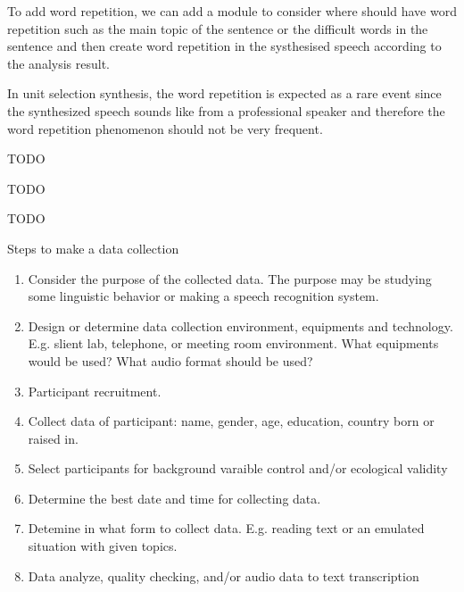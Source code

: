 \documentclass[12pt]{article}
\newenvironment{problem}[2][Problem]{\begin{trivlist}
\item[\hskip \labelsep {\bfseries #1}\hskip \labelsep {\bfseries #2.}]}{\end{trivlist}}
\begin{document}
\begin{problem}{2.2}
    To add word repetition, we can add a module to consider where should have 
    word repetition such as the main topic of the sentence or the difficult words
    in the sentence and then create word repetition in the systhesised speech according
    to the analysis result.

    In unit selection synthesis, the word repetition is expected as a rare event
    since the synthesized speech sounds like from a professional speaker and therefore
    the word repetition phenomenon should not be very frequent.
\end{problem}

\begin{problem}{2.3}
    TODO
\end{problem}

\begin{problem}{3.1}
    TODO
\end{problem}

\begin{problem}{3.2}
    TODO
\end{problem}

\begin{problem}{4.1}
    Steps to make a data collection
    \begin{enumerate}
        \item Consider the purpose of the collected data. The purpose may be 
        studying some linguistic behavior or making a speech recognition system.
        \item Design or determine data collection environment, equipments and technology.
        E.g. slient lab, telephone, or meeting room environment. 
        What equipments would be used? What audio format should be used?
        \item Participant recruitment.
        \item Collect data of participant: name, gender, age, education, country born or raised in.
        \item Select participants for background varaible control and/or ecological validity
        \item Determine the best date and time for collecting data.
        \item Detemine in what form to collect data.
        E.g. reading text or an emulated situation with given topics.
        \item Data analyze, quality checking, and/or audio data to text transcription
    \end{enumerate}
\end{problem}
\end{document}

